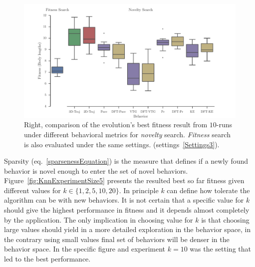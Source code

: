 \begin{figure}
\centering
\includegraphics[width=1.0\textwidth]{../Figures/Results/BehaviorsPerformance.pdf}
\caption{Right, comparison of the evolution's best fitness result from $10$-runs under different behavioral metrics for \emph{novelty} search. \emph{Fitness} search is also evaluated under the same settings. (settings~\ref{Settings3}).}
\label{fig:BehaviorsPerformance}
\end{figure}

Sparsity (eq.~\ref{sparsenessEquation}) is the measure that defines if a newly found behavior is novel enough to enter the set of novel behaviors. Figure~\ref{fig:KnnExperimentSize5} presents the resulted best so far fitness given different values for $k \in \lbrace 1, 2, 5, 10, 20 \rbrace$. In principle $k$ can define how tolerate the algorithm can be with new behaviors. It is not certain that a specific value for $k$ should give the highest performance in fitness and it depends almost completely by the application. The only implication in choosing value for $k$ is that choosing large values should yield in a more detailed exploration in the behavior space, in the contrary using small values final set of behaviors will be denser in the behavior space. In the specific figure and experiment $k=10$ was the setting that led to the best performance.



